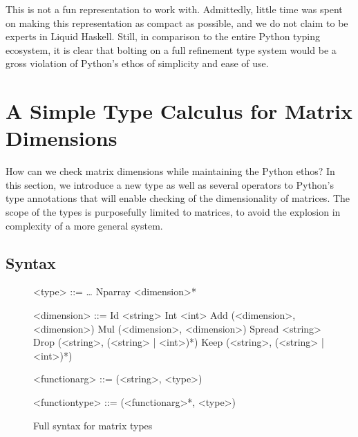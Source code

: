 \documentclass{book}
\begin{document}
This is not a fun representation to work with. Admittedly, little time was spent on making this representation as compact as possible, and we do not claim to be experts in Liquid Haskell. Still, in comparison to the entire Python typing ecosystem, it is clear that bolting on a full refinement type system would be a gross violation of Python's ethos of simplicity and ease of use.
\newpage

\section{A Simple Type Calculus for Matrix Dimensions}

How can we check matrix dimensions while maintaining the Python ethos? In this section, we introduce a new type as well as several operators to Python's type annotations that will enable checking of the dimensionality of matrices. The scope of the types is purposefully limited to matrices, to avoid the explosion in complexity of a more general system.

\subsection{Syntax}

\begin{figure}
    \centering
    \begin{grammar}
        <type> ::= \ldots
        \alt Nparray <dimension>*

        <dimension> ::= Id <string>
        \alt Int <int>
        \alt Add (<dimension>, <dimension>)
        \alt Mul (<dimension>, <dimension>)
        \alt Spread <string>
        \alt Drop (<string>, (<string> | <int>)*)
        \alt Keep (<string>, (<string> | <int>)*)

        <functionarg> ::= (<string>, <type>)

        <functiontype> ::= (<functionarg>*, <type>)

    \end{grammar}
    \caption{Full syntax for matrix types}
    \label{syntax}
\end{figure}
\end{document}
